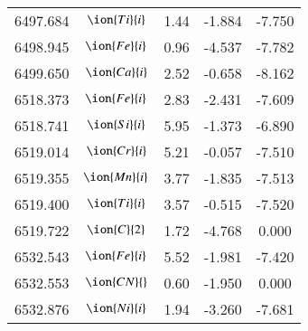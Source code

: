\documentclass[fleqn,usenatbib]{mnras}
\begin{document}
\begin{center}
\begin{table}
\begin{tabular}{ccccc}
6497.684 &  $\ion{Ti}{i}$  & 1.44 & -1.884 & -7.750 \\ 
6498.945 &  $\ion{Fe}{i}$  & 0.96 & -4.537 & -7.782 \\ 
6499.650 &  $\ion{Ca}{i}$  & 2.52 & -0.658 & -8.162 \\ 
6518.373 &  $\ion{Fe}{i}$  & 2.83 & -2.431 & -7.609 \\ 
6518.741 &  $\ion{Si}{i}$  & 5.95 & -1.373 & -6.890 \\ 
6519.014 &  $\ion{Cr}{i}$  & 5.21 & -0.057 & -7.510 \\ 
6519.355 &  $\ion{Mn}{i}$  & 3.77 & -1.835 & -7.513 \\ 
6519.400 &  $\ion{Ti}{i}$  & 3.57 & -0.515 & -7.520 \\ 
6519.722 &  $\ion{C}{2}$ & 1.72 & -4.768 & 0.000 \\ 
6532.543 &  $\ion{Fe}{i}$  & 5.52 & -1.981 & -7.420 \\ 
6532.553 & $\ion{CN}{}$ & 0.60 & -1.950 & 0.000 \\ 
6532.876 &  $\ion{Ni}{i}$  & 1.94 & -3.260 & -7.681 \\ 
 \end{tabular}
 \end{table}
 \end{center}
\end{document}
